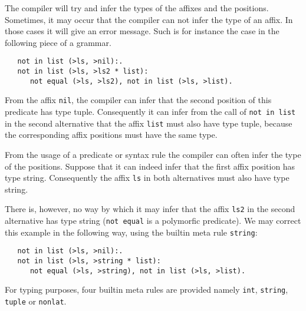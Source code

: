The \EAG compiler will try and infer the types of the affixes and the
positions. Sometimes, it may occur that the compiler can not infer
the type of an affix. In those cases it will give an error message.
Such is for instance the case in the following piece of a grammar.
\begin{verbatim}
   not in list (>ls, >nil):.
   not in list (>ls, >ls2 * list):
      not equal (>ls, >ls2), not in list (>ls, >list).
\end{verbatim}
From the affix {\tt nil}, the compiler can infer that the second
position of this predicate has type tuple. Consequently it can infer
from the call of {\tt not in list} in the second alternative that
the affix {\tt list} must also have type tuple, because the
corresponding affix positions must have the same type.

From the usage of a predicate or syntax rule the compiler can
often infer the type of the positions. Suppose that it can indeed
infer that the first affix position has type string. Consequently
the affix {\tt ls} in both alternatives must also have type
string.

There is, however, no way by which it may infer that the affix {\tt ls2}
in the second alternative has type string ({\tt not equal} is a
polymorfic predicate). We may correct this example in the following
way, using the builtin meta rule {\tt string}:
\begin{verbatim}
   not in list (>ls, >nil):.
   not in list (>ls, >string * list):
      not equal (>ls, >string), not in list (>ls, >list).
\end{verbatim}
For typing purposes, four builtin meta rules are provided namely
{\tt int}, {\tt string}, {\tt tuple} or {\tt nonlat}.
